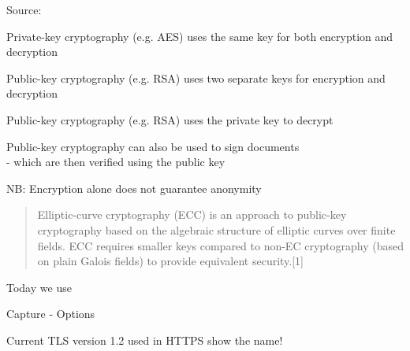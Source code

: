 \documentclass[Screen16to9,17pt]{foils}
\begin{document}
Source: 

\begin{list1}
\item Private-key cryptography (e.g. AES) uses the same key
  for both encryption and decryption
\item Public-key cryptography (e.g. RSA) uses two
  separate keys for encryption and decryption
\end{list1}

\begin{list1}
\item Public-key cryptography (e.g. RSA) uses the private
  key to decrypt
\item Public-key cryptography can also be used to
  sign documents\\ - which are then verified using the public key
\item NB: Encryption alone does not guarantee anonymity
\end{list1}


\begin{quote}
Elliptic-curve cryptography (ECC) is an approach to public-key cryptography based on the algebraic structure of elliptic curves over finite fields. ECC requires smaller keys compared to non-EC cryptography (based on plain Galois fields) to provide equivalent security.[1]
\end{quote}

\begin{list2}
\item Today we use 
\end{list2}





\centerline{Capture - Options}



\centerline{Current TLS version 1.2 used in HTTPS show the name!}



\end{document}
